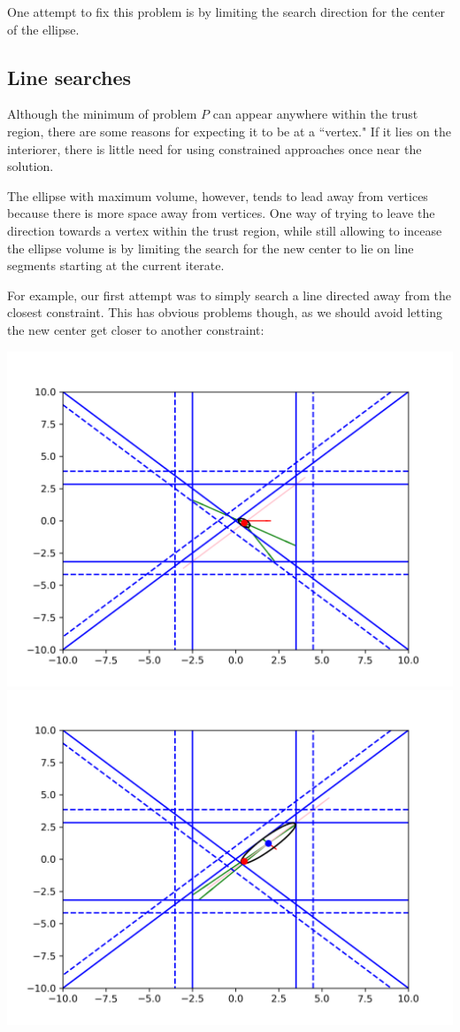 \documentclass{article}
\begin{document}
One attempt to fix this problem is by limiting the search direction for the center of the ellipse.

\subsection{Line searches}
Although the minimum of problem $P$ can appear anywhere within the trust region, there are some reasons for expecting it to be at a ``vertex."
If it lies on the interiorer, there is little need for using constrained approaches once near the solution.

The ellipse with maximum volume, however, tends to lead away from vertices because there is more space away from vertices.
One way of trying to leave the direction towards a vertex within the trust region, while still allowing to incease the ellipse volume is by limiting the search for the new center to lie on line segments starting at the current iterate.

For example, our first attempt was to simply search a line directed away from the closest constraint.
This has obvious problems though, as we should avoid letting the new center get closer to another constraint:

\includegraphics[scale=0.2]{line_1.png}
\includegraphics[scale=0.2]{line_2.png}
\end{document}
